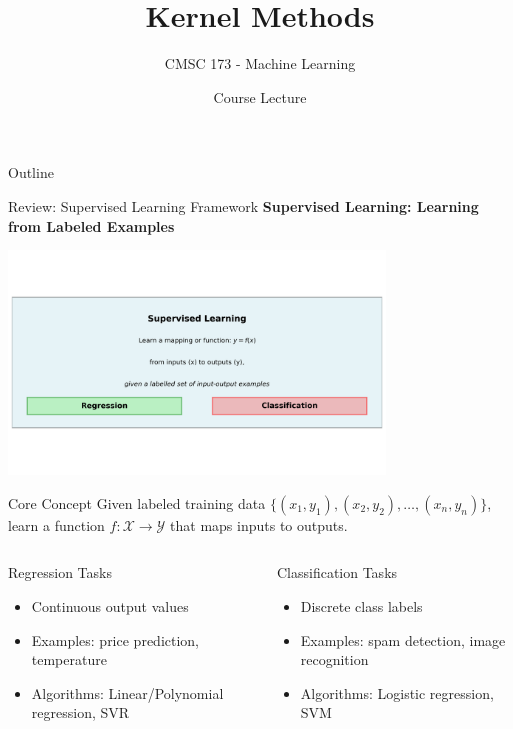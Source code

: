 \documentclass[8pt,aspectratio=1610]{beamer}
\title{Kernel Methods}
\subtitle{CMSC 173 - Machine Learning}
\author{Course Lecture}
\date{}
\begin{document}
\begin{frame}
\titlepage
\end{frame}

\begin{frame}{Outline}
\tableofcontents
\end{frame}

\begin{frame}{Review: Supervised Learning Framework}
\centering
\textbf{Supervised Learning: Learning from Labeled Examples}
\vspace{0.3cm}

\includegraphics[width=0.75\textwidth]{../figures/supervised_learning_overview.png}

\vspace{0.3cm}
\begin{block}{Core Concept}
Given labeled training data $\{(x_1, y_1), (x_2, y_2), \ldots, (x_n, y_n)\}$, learn a function $f: \mathcal{X} \to \mathcal{Y}$ that maps inputs to outputs.
\end{block}

\begin{columns}[t]
\begin{column}{0.48\textwidth}
\begin{block}{Regression Tasks}
\begin{itemize}
\setlength{\itemsep}{1pt}
\item Continuous output values
\item Examples: price prediction, temperature
\item Algorithms: Linear/Polynomial regression, SVR
\end{itemize}
\end{block}
\end{column}

\begin{column}{0.48\textwidth}
\begin{block}{Classification Tasks}
\begin{itemize}
\setlength{\itemsep}{1pt}
\item Discrete class labels
\item Examples: spam detection, image recognition
\item Algorithms: Logistic regression, SVM
\end{itemize}
\end{block}
\end{column}
\end{columns}
\end{frame}
\end{document}
